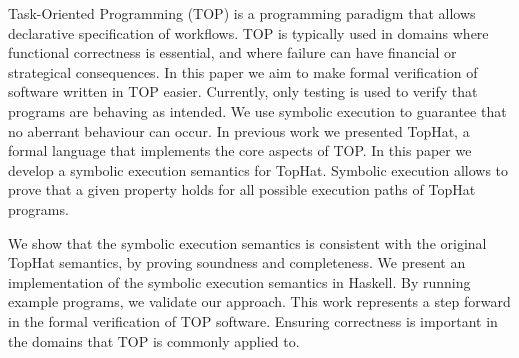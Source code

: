 
Task-Oriented Programming (TOP) is a programming paradigm that allows declarative specification of workflows.
TOP is typically used in domains where functional correctness is essential, and where failure can have financial or strategical consequences.
In this paper we aim to make formal verification of software written in TOP easier.
Currently, only testing is used to verify that programs are behaving as intended.
We use symbolic execution to guarantee that no aberrant behaviour can occur.
In previous work we presented TopHat, a formal language that implements the core aspects of TOP.
In this paper we develop a symbolic execution semantics for TopHat.
Symbolic execution allows to prove that a given property holds for all possible execution paths of TopHat programs.

We show that the symbolic execution semantics is consistent with the original TopHat semantics, by proving soundness and completeness.
We present an implementation of the symbolic execution semantics in Haskell.
By running example programs, we validate our approach.
This work represents a step forward in the formal verification of TOP software.
Ensuring correctness is important in the domains that TOP is commonly applied to.


